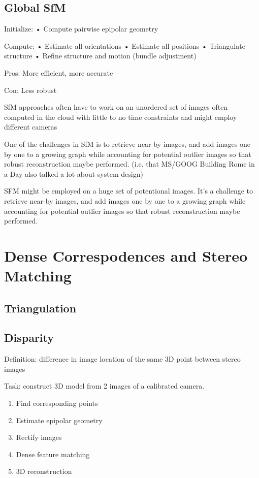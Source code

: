 \subsection{Global SfM}

Initialize:
• Compute pairwise epipolar geometry

Compute:
• Estimate all orientations
• Estimate all positions
• Triangulate structure
• Refine structure and motion (bundle adjustment)

Pros: More efficient, more accurate 

Con: Less robust

SfM approaches often have to work on an unordered set of images often computed in the cloud with little to no time constraints and might employ different cameras

One of the challenges in SfM is to retrieve near-by images, and add images one by one to a growing graph while accounting for potential outlier images so that robust reconstruction maybe performed. (i.e. that MS/GOOG Building  Rome in a Day also talked a lot about system design)

SFM might be employed on a huge set of potentional images. It's a challenge to retrieve near-by images, and add images one by one to a growing graph while accounting for potential outlier images so that robust reconstruction maybe performed. 

\section{Dense Correspodences and Stereo Matching}

\subsection{Triangulation}


\subsection{Disparity}
Definition: difference in image location of the same 3D point between stereo images

Task: construct 3D model from 2 images of a calibrated camera.

\begin{enumerate}
\item Find corresponding points
\item Estimate epipolar geometry
\item Rectify images
\item Dense feature matching
\item 3D reconstruction
\end{enumerate}

